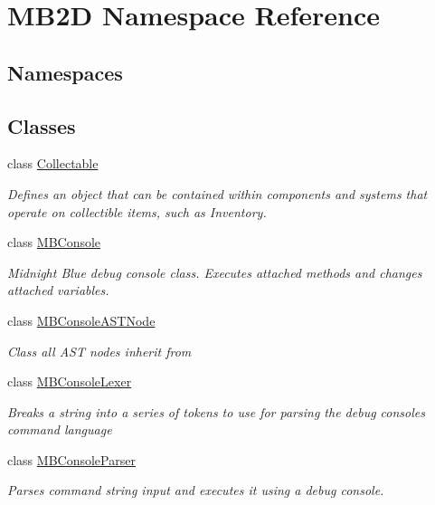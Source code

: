 \hypertarget{namespace_m_b2_d}{}\section{M\+B2D Namespace Reference}
\label{namespace_m_b2_d}
\subsection*{Namespaces}
\begin{DoxyCompactItemize}
\end{DoxyCompactItemize}
\subsection*{Classes}
\begin{DoxyCompactItemize}
\item 
class \hyperlink{class_m_b2_d_1_1_collectable}{Collectable}
\begin{DoxyCompactList}\small\item\em Defines an object that can be contained within components and systems that operate on collectible items, such as Inventory. \end{DoxyCompactList}\item 
class \hyperlink{class_m_b2_d_1_1_m_b_console}{M\+B\+Console}
\begin{DoxyCompactList}\small\item\em Midnight Blue debug console class. Executes attached methods and changes attached variables. \end{DoxyCompactList}\item 
class \hyperlink{class_m_b2_d_1_1_m_b_console_a_s_t_node}{M\+B\+Console\+A\+S\+T\+Node}
\begin{DoxyCompactList}\small\item\em Class all A\+ST nodes inherit from \end{DoxyCompactList}\item 
class \hyperlink{class_m_b2_d_1_1_m_b_console_lexer}{M\+B\+Console\+Lexer}
\begin{DoxyCompactList}\small\item\em Breaks a string into a series of tokens to use for parsing the debug consoles command language \end{DoxyCompactList}\item 
class \hyperlink{class_m_b2_d_1_1_m_b_console_parser}{M\+B\+Console\+Parser}
\begin{DoxyCompactList}\small\item\em Parses command string input and executes it using a debug console. \end{DoxyCompactList}\item 

\end{DoxyCompactItemize}
